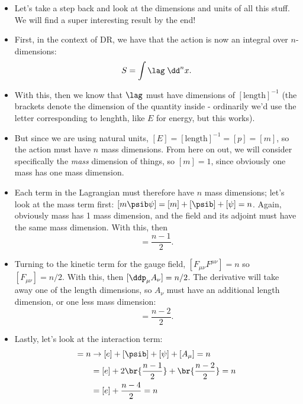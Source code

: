 \begin{itemize}
    \item Let's take a step back and look at the dimensions and units of all this stuff. We will find a super interesting result by the end!
    \item First, in the context of DR, we have that the action is now an integral over $n$-dimensions:
        \begin{equation}
            S = \int \lag \;\dd^n x.
        \end{equation}
    \item With this, then we know that $\lag$ must have dimensions of $[\mathrm{length}]^{-1}$ (the brackets denote the dimension of the quantity inside - ordinarily we'd use the letter corresponding to lenghth, like $E$ for energy, but this works).
    \item But since we are using natural units, $[E] = [\mathrm{length}]^{-1} = [p] = [m]$, so the action must have $n$ mass dimensions. From here on out, we will consider specifically the \textit{mass} dimension of things, so $[m] = 1$, since obviously one mass has one mass dimension.
    \item Each term in the Lagrangian must therefore have $n$ mass dimensions; let's look at the mass term first: $[m\psib\psi] = [m] + [\psib] + [\psi] = n$. Again, obviously mass has 1 mass dimension, and the field and its adjoint must have the same mass dimension. With this, then
        \begin{equation*}
            [\psi] = \frac{n-1}{2}.
        \end{equation*}
    \item Turning to the kinetic term for the gauge field, $[F_{\mu\nu}F^{\mu\nu}] = n$ so $[F_{\mu\nu}] = n/2$. With this, then $[\ddp_{\mu}A_{\nu}] = n/2$. The derivative will take away one of the length dimensions, so $A_{\nu}$ must have an additional length dimension, or one less mass dimension: 
        \begin{equation}
            [A_{\mu}] = \frac{n-2}{2}.
        \end{equation}
    \item Lastly, let's look at the interaction term:
        \begin{align}
            [e\psib \psi A_{\mu}] = n &\rightarrow [e] + [\psib] + [\psi] + [A_{\mu}] = n \\
            &= [e] + 2\br{\frac{n-1}{2}} + \br{\frac{n-2}{2}} = n \\
            &= [e] + \frac{n-4}{2} = n \\

\end{align}
\end{itemize}
